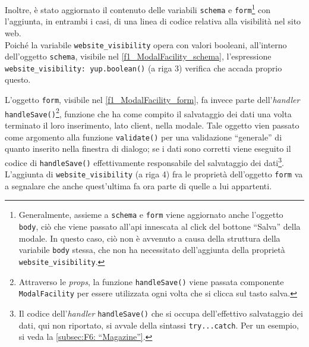 

Inoltre, è stato aggiornato il contenuto delle variabili \texttt{schema} e \texttt{form}\footnote{Generalmente, assieme a \texttt{schema} e \texttt{form} viene aggiornato anche l'oggetto \texttt{body}, ciò che viene passato all'\gls{api} innescata al click del bottone “Salva” della modale. In questo caso, ciò non è avvenuto a causa della struttura della variabile \texttt{body} stessa, che non ha necessitato dell'aggiunta della proprietà \texttt{website\_visibility}.} con l'aggiunta, in entrambi i casi, di una linea di codice relativa alla visibilità nel sito web.\\
Poiché la variabile \texttt{website\_visibility} opera con valori booleani, all'interno dell'oggetto \texttt{schema}, visibile nel \autoref{f1_ModalFacility_schema}, l'espressione \texttt{website\_visibility: yup.boolean()} (a riga 3) verifica che accada proprio questo.


L'oggetto \texttt{form}, visibile nel \autoref{f1_ModalFacility_form}, fa invece parte dell'\textit{handler} \texttt{handleSave()}\footnote{Attraverso le \textit{props}, la funzione \texttt{handleSave()} viene passata componente \texttt{ModalFacility} per essere utilizzata ogni volta che si clicca sul tasto salva.}, funzione che ha come compito il salvataggio dei dati una volta terminato il loro inserimento, lato client, nella modale. Tale oggetto vien passato come argomento alla funzione \texttt{validate()} per una validazione “generale” di quanto inserito nella finestra di dialogo; se i dati sono corretti viene eseguito il codice di \texttt{handleSave()} effettivamente responsabile del salvataggio dei dati\footnote{Il codice dell'\textit{handler} \texttt{handleSave()} che si occupa dell'effettivo salvataggio dei dati, qui non riportato, si avvale della sintassi \texttt{try...catch}. Per un esempio, si veda la \autoref{subsec:F6: “Magazine”}.}. L'aggiunta di \texttt{website\_visibility} (a riga 4) fra le proprietà dell'oggetto \texttt{form} va a segnalare che anche quest'ultima fa ora parte di quelle a lui appartenti.



